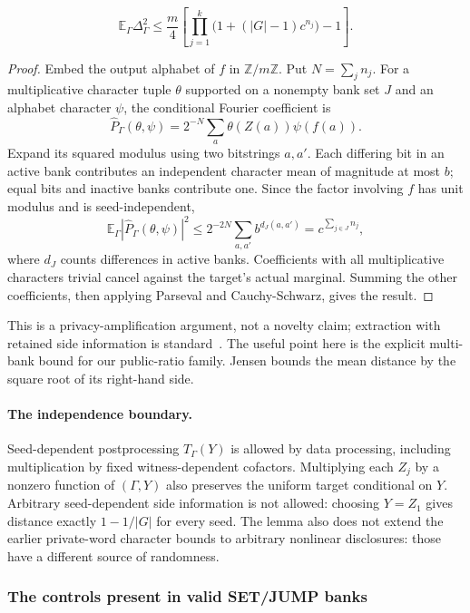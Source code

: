 \begin{lemma}
\[
 \mathbb E_\Gamma\Delta_\Gamma^2\le
 \frac m4\left[\prod_{j=1}^k\bigl(1+(|G|-1)c^{n_j}\bigr)-1\right].
\]
\end{lemma}
\begin{proof}
Embed the output alphabet of $f$ in $\mathbb Z/m\mathbb Z$. Put $N=\sum_j n_j$. For a multiplicative character tuple $\theta$ supported on a nonempty bank set $J$ and an alphabet character $\psi$, the conditional Fourier coefficient is
\[
 \widehat P_\Gamma(\theta,\psi)
 =2^{-N}\sum_a\theta(Z(a))\psi(f(a)).
\]
Expand its squared modulus using two bitstrings $a,a'$. Each differing bit in an active bank contributes an independent character mean of magnitude at most $b$; equal bits and inactive banks contribute one. Since the factor involving $f$ has unit modulus and is seed-independent,
\[
 \mathbb E_\Gamma|\widehat P_\Gamma(\theta,\psi)|^2
 \le 2^{-2N}\sum_{a,a'}b^{d_J(a,a')}
 =c^{\sum_{j\in J}n_j},
\]
where $d_J$ counts differences in active banks. Coefficients with all multiplicative characters trivial cancel against the target's actual marginal. Summing the other coefficients, then applying Parseval and Cauchy-Schwarz, gives the result.
\end{proof}

This is a privacy-amplification argument, not a novelty claim; extraction with retained side information is standard~\cite{dors}. The useful point here is the explicit multi-bank bound for our public-ratio family. Jensen bounds the mean distance by the square root of its right-hand side.

\paragraph{The independence boundary.} Seed-dependent postprocessing $T_\Gamma(Y)$ is allowed by data processing, including multiplication by fixed witness-dependent cofactors. Multiplying each $Z_j$ by a nonzero function of $(\Gamma,Y)$ also preserves the uniform target conditional on $Y$. Arbitrary seed-dependent side information is not allowed: choosing $Y=Z_1$ gives distance exactly $1-1/|G|$ for every seed. The lemma also does not extend the earlier private-word character bounds to arbitrary nonlinear disclosures: those have a different source of randomness.

\subsubsection{The controls present in valid SET/JUMP banks}

